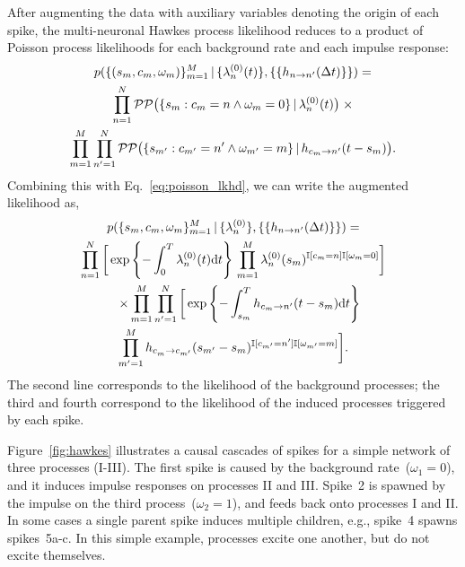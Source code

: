 After augmenting the data with auxiliary variables denoting the origin
of each spike, the multi-neuronal Hawkes process likelihood reduces to 
a product of Poisson process likelihoods for each background rate and 
each impulse response:
\begin{multline*}
  p(\{(s_m,c_m,\omega_m)\}_{m=1}^M \,|\, 
  \{\lambda^{(0)}_{n}(t)\}, \{\{h_{n \to n'}(\Delta t)\}\}) = \\
  \prod_{n=1}^N \mathcal{PP} \big(\{s_{m}: c_{m}=n \wedge \omega_{m}=0\} \,|\, \lambda^{(0)}_{n}(t) \big) \; \times\\
  \prod_{m=1}^M \prod_{n'=1}^N \mathcal{PP} \big(\{s_{m'}: c_{m'}=n' \wedge \omega_{m'}=m\} \,|\, h_{c_m \to n'}(t-s_m) \big).
\end{multline*}
Combining this with 
Eq.~\ref{eq:poisson_lkhd}, we can
write the augmented likelihood as,
\begin{multline}
  \label{eq:hawkes_likelihood}
  p(\{s_m, c_m, \omega_m\}_{m=1}^M \,|\, \{\lambda^{(0)}_{n}\}, \{\{h_{n \to n'}(\Delta t)\}\}) = \\
  \prod^N_{n=1} \bigg[
  \exp\left\{ -\int_0^T \lambda^{(0)}_{n}(t)\mathrm{d}t \right\} \,
  \prod^M_{m=1}
   \lambda^{(0)}_{n}(s_m)^{\mathbb{I}[c_m=n] \mathbb{I}[\omega_m = 0]} \bigg]\\
  \quad\times \prod_{m=1}^M \prod_{n'=1}^N \bigg[
  \exp\left\{-\int^T_{s_m} h_{c_m \to n'}(t - s_m) \mathrm{d}t \right\} \\
  \prod_{m'=1}^M h_{c_m^{~} \to c_{m'}}(s_{m'}-s_m)^{\mathbb{I}[c_{m'}=n'] \mathbb{I}[\omega_{m'}=m]}\bigg].
\end{multline}
The second line corresponds to the likelihood of the background
processes; the third and fourth correspond to the likelihood of the
induced processes triggered by each spike.

Figure~\ref{fig:hawkes} illustrates a causal cascades of spikes for a
simple network of three processes (I-III).  The first spike is caused
by the background rate~(${\omega_1=0}$), and it induces impulse responses
on processes II and III. Spike~2 is spawned by the impulse on the
third process~(${\omega_2=1}$), and feeds back onto processes I and II. In
some cases a single parent spike induces multiple children, e.g.,
spike~4 spawns spikes~{5a-c}. In this simple example, processes excite
one another, but do not excite themselves.

